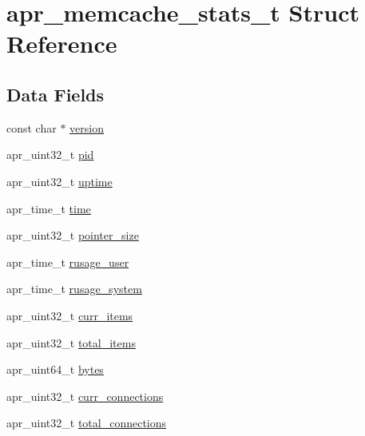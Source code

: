 \hypertarget{structapr__memcache__stats__t}{\section{apr\-\_\-memcache\-\_\-stats\-\_\-t Struct Reference}
\label{structapr__memcache__stats__t}
}
\subsection*{Data Fields}
\begin{DoxyCompactItemize}
\item 
const char $\ast$ \hyperlink{structapr__memcache__stats__t_a5fa17a72064c6b5ae0624f5945fceea7}{version}
\item 
apr\-\_\-uint32\-\_\-t \hyperlink{structapr__memcache__stats__t_a8ed498f4a6cbfb55312b8b67ce2689d3}{pid}
\item 
apr\-\_\-uint32\-\_\-t \hyperlink{structapr__memcache__stats__t_aec6db8440a51aabfbfaf2130ec5a78bb}{uptime}
\item 
apr\-\_\-time\-\_\-t \hyperlink{structapr__memcache__stats__t_adc02da0e6bfc619cd7eaebfae94404ff}{time}
\item 
apr\-\_\-uint32\-\_\-t \hyperlink{structapr__memcache__stats__t_a01bd7ed7ba82b7a7bf03f9de468fcc2e}{pointer\-\_\-size}
\item 
apr\-\_\-time\-\_\-t \hyperlink{structapr__memcache__stats__t_a4e43e96550407edd29e81ba59706c5b5}{rusage\-\_\-user}
\item 
apr\-\_\-time\-\_\-t \hyperlink{structapr__memcache__stats__t_a2eff9899b9cb4ee704fae93af4c5bf76}{rusage\-\_\-system}
\item 
apr\-\_\-uint32\-\_\-t \hyperlink{structapr__memcache__stats__t_abe0f28297441a55d30a6c7c8e0faaea3}{curr\-\_\-items}
\item 
apr\-\_\-uint32\-\_\-t \hyperlink{structapr__memcache__stats__t_a298fd199bee38cd658d54f6099e9fb58}{total\-\_\-items}
\item 
apr\-\_\-uint64\-\_\-t \hyperlink{structapr__memcache__stats__t_a327ed9d43d6df23337101eda379a7870}{bytes}
\item 
apr\-\_\-uint32\-\_\-t \hyperlink{structapr__memcache__stats__t_a1db1876674d978f4f70ae465a060bfc2}{curr\-\_\-connections}
\item 
apr\-\_\-uint32\-\_\-t \hyperlink{structapr__memcache__stats__t_a47413a65552fa02fcc8adb74b3d0b8c0}{total\-\_\-connections}
\item 

\end{DoxyCompactItemize}
